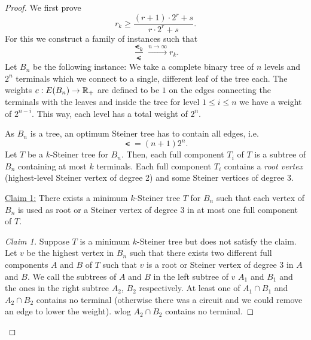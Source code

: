 \documentclass[../skript.tex]{subfiles}
\begin{document}
\begin{proof}
We first prove
\[
r_k \geq \frac{(r+1) \cdot 2^r + s}{r \cdot 2^r + s}.
\]
For this we construct a family of instances such that
\[
	\frac{\smt_k}{\smt} \xrightarrow{n \to \infty} r_k.
\]
Let $B_n$ be the following instance: We take a complete binary tree of $n$ levels and $2^n$ terminals which we connect to a single, different leaf of the tree each. The weights $c : E(B_n) \to \mathbb{R}_+$ are defined to be $1$ on the edges connecting the terminals with the leaves and inside the tree for level $1 \leq i \leq n$ we have a weight of $2^{n-i}$. This way, each level has a total weight of $2^n$.

As $B_n$ is a tree, an optimum Steiner tree has to contain all edges, i.e.
\[
	\smt = (n+1) 2^n.
\]
Let $T$ be a $k$-Steiner tree for $B_n$. Then, each full component $T_i$ of $T$ is a subtree of $B_n$ containing at most $k$ terminals. Each full component $T_i$ contains a \emph{root vertex} (highest-level Steiner vertex of degree 2) and some Steiner vertices of degree 3.

\underline{Claim 1:} There exists a minimum $k$-Steiner tree $T$ for $B_n$ such that each vertex of $B_n$ is used as root or a Steiner vertex of degree 3 in at most one full component of $T$.
\begin{proof}[Claim 1]
Suppose $T$ is a minimum $k$-Steiner tree but does not satisfy the claim. Let $v$ be the highest vertex in $B_n$ such that there exists two different full components $A$ and $B$ of $T$ such that $v$ is a root or Steiner vertex of degree 3 in $A$ and $B$. We call the subtrees of $A$ and $B$ in the left subtree of $v$ $A_1$ and $B_1$ and the ones in the right subtree $A_2$, $B_2$ respectively.
At least one of $A_1 \cap B_1$ and $A_2 \cap B_2$ contains no terminal (otherwise there was a circuit and we could remove an edge to lower the weight).
\ac{wlog} $A_2 \cap B_2$ contains no terminal.


\end{proof}
\end{proof}
\end{document}

